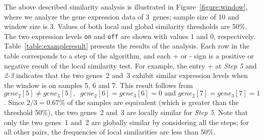The above described similarity analysis is illustrated in Figure~\ref{figure:window}, where we analyze the
gene expression data of 3~genes; sample size of 10 and window size is 3. Values of both local and global
similarity thresholds are 50\%. The two expression levels \texttt{on} and \texttt{off} are shown with values
$1$ and $0$, respectively. Table~\ref{table:exampleresult} presents the results of the analysis. Each row in
the table corresponds to a step of the algorithm, and each + or - sign is a positive or negative result of
the local similarity test. For example, the entry + at \emph{Step 5} and \emph{2-3} indicates that the two
genes~2 and~3 exhibit similar expression levels when the window is on samples 5, 6 and 7. This result follows
from $gene_2[5]\neq gene_3[5],\;\;gene_2[6] = gene_3[6] = 0 \text{ and } gene_2[7] = gene_3[7] = 1$. Since
$2/3 = 0.67\%$ of the samples are equivalent (which is greater than the threshold 50\%), the two genes~2
and~3 are locally similar for \emph{Step 5}. Note that only the two genes~1 and~2 are globally similar by
considering all the steps; for all other pairs, the frequencies of local similarities are less than 50\%.

